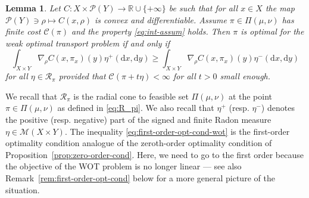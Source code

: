 \documentclass[leqno, 11pt, a4paper]{amsart}
\newtheorem{lem}{Lemma}
\theoremstyle{definition}
\newcommand{\cR}{\mathcal{R}}
\newcommand{\R}{\mathbb{R}}
\newcommand{\C}{\mathscr{C}}
\newcommand{\cP}{\mathcal{P}}
\newcommand{\cM}{\mathcal{M}}
\newcommand{\dd}{\mathrm{d}}
\newcommand{\extendedR}{\R \cup \{+\infty\}}
\begin{document}
\begin{lem}\label{lem:first-order-opt-cond-wot}
	Let $C : X \times \cP(Y) \to \extendedR$ be such that for all $x \in X$ the map $\cP(Y) \ni \rho \mapsto C(x, \rho)$ is convex and differentiable. Assume $\pi \in \Pi(\mu, \nu)$ has finite cost $\C(\pi)$ and the property \eqref{eq:int-assum} holds. Then $\pi$ is optimal for the weak optimal transport problem if and only if
	\begin{equation}\label{eq:first-order-opt-cond-wot}
	\boxed{\int_{X \times Y} \nabla_\rho C(x, \pi_x)(y)\eta^+(\dd x, \dd y) \geq \int_{X \times Y} \nabla_\rho C(x, \pi_x)(y)\eta^-(\dd x,\dd y)}
	\end{equation}
	for all $\eta \in \cR_\pi$ provided that $\C(\pi + t \eta) < \infty$ for all $t > 0$ small enough. 
	\end{lem}
	 We recall that $\cR_\pi$ is the radial cone to feasible set $\Pi(\mu, \nu)$ at the point $\pi \in \Pi(\mu, \nu)$ as defined in \eqref{eq:R_pi}. We also recall that $\eta^+$ (resp. $\eta^-$) denotes the positive (resp. negative) part of the signed and finite Radon measure $\eta \in \cM(X \times Y)$. The inequality \eqref{eq:first-order-opt-cond-wot} is the first-order optimality condition analogue of the zeroth-order optimality condition of Proposition~\ref{prop:zero-order-cond}. Here, we need to go to the first order because the objective of the WOT problem is no longer linear — see also Remark~\ref{rem:first-order-opt-cond} below for a more general picture of the situation.
\end{document}
